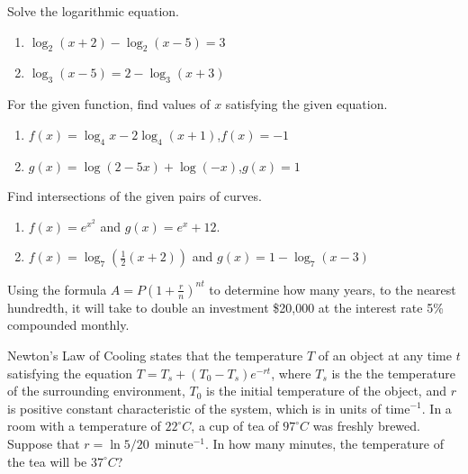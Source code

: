 \begin{exercise}

Solve the logarithmic equation.

\begin{enumerate}
\item
  \(\log_2(x+2)-\log_2(x-5)=3\)
\item
  \(\log_3(x-5)=2-\log_3(x+3)\)
\end{enumerate}

\end{exercise}

\begin{exercise}

For the given function, find values of \(x\) satisfying the given
equation.

\begin{enumerate}
\item
  \(f(x)=\log_4x-2\log_4(x+1)\),\quad \(f(x)=-1\)
\item
  \(g(x)=\log(2-5x)+\log(-x)\),\quad \(g(x)=1\)
\end{enumerate}

\end{exercise}

\begin{exercise}

Find intersections of the given pairs of curves.

\begin{enumerate}
\item
  \(f(x)=e^{x^2}\) and \(g(x)=e^x+12\).
\item
  \(f(x)=\log_7\left(\frac12(x+2)\right)\) and
  \(g(x)=1-\log_7(x-3)\)
\end{enumerate}

\end{exercise}

\begin{exercise}

Using the formula \(A=P(1+\frac rn)^{nt}\) to determine how many years,
to the nearest hundredth, it will take to double an investment \$20,000
at the interest rate 5\% compounded monthly.

\end{exercise}
\vspace*{6\baselineskip}

\begin{exercise}

Newton's Law of Cooling states that the temperature \(T\) of an object
at any time \(t\) satisfying the equation \(T=T_s+(T_0-T_s)e^{-rt}\),
where \(T_s\) is the the temperature of the surrounding environment,
\(T_0\) is the initial temperature of the object, and \(r\) is positive
constant characteristic of the system, which is in units of
\({\displaystyle \text{time}^{-1}}\). In a room with a temperature of
\(22 ^\circ C\), a cup of tea of \(97 ^\circ C\) was freshly brewed.
Suppose that \(r=\ln 5/20~~\text{minute}^{-1}\). In how many minutes,
the temperature of the tea will be \(37 ^\circ C\)?

\end{exercise}

